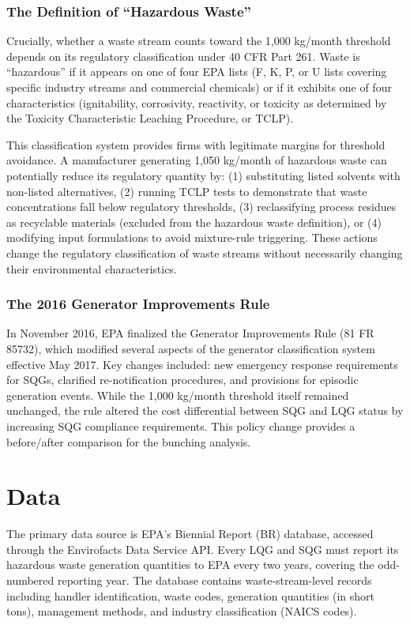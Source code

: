 \documentclass[12pt]{article}
\begin{document}
\subsubsection*{The Definition of ``Hazardous Waste''}
Crucially, whether a waste stream counts toward the 1,000 kg/month threshold depends on its regulatory classification under 40 CFR Part 261. Waste is ``hazardous'' if it appears on one of four EPA lists (F, K, P, or U lists covering specific industry streams and commercial chemicals) or if it exhibits one of four characteristics (ignitability, corrosivity, reactivity, or toxicity as determined by the Toxicity Characteristic Leaching Procedure, or TCLP).

This classification system provides firms with legitimate margins for threshold avoidance. A manufacturer generating 1,050 kg/month of hazardous waste can potentially reduce its regulatory quantity by: (1) substituting listed solvents with non-listed alternatives, (2) running TCLP tests to demonstrate that waste concentrations fall below regulatory thresholds, (3) reclassifying process residues as recyclable materials (excluded from the hazardous waste definition), or (4) modifying input formulations to avoid mixture-rule triggering. These actions change the regulatory classification of waste streams without necessarily changing their environmental characteristics.

\subsubsection*{The 2016 Generator Improvements Rule}
In November 2016, EPA finalized the Generator Improvements Rule (81 FR 85732), which modified several aspects of the generator classification system effective May 2017. Key changes included: new emergency response requirements for SQGs, clarified re-notification procedures, and provisions for episodic generation events. While the 1,000 kg/month threshold itself remained unchanged, the rule altered the cost differential between SQG and LQG status by increasing SQG compliance requirements. This policy change provides a before/after comparison for the bunching analysis.


\section{Data}
\label{sec:data}

The primary data source is EPA's Biennial Report (BR) database, accessed through the Envirofacts Data Service API. Every LQG and SQG must report its hazardous waste generation quantities to EPA every two years, covering the odd-numbered reporting year. The database contains waste-stream-level records including handler identification, waste codes, generation quantities (in short tons), management methods, and industry classification (NAICS codes).
\end{document}
